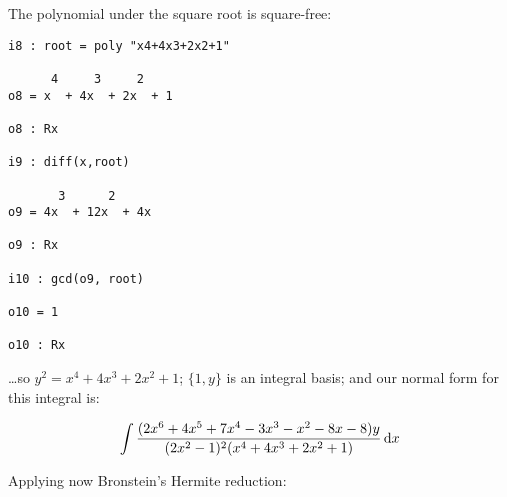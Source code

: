 The polynomial under the square root is square-free:

{\small\begin{verbatim}
i8 : root = poly "x4+4x3+2x2+1"

      4     3     2
o8 = x  + 4x  + 2x  + 1

o8 : Rx

i9 : diff(x,root)

       3      2
o9 = 4x  + 12x  + 4x

o9 : Rx

i10 : gcd(o9, root)

o10 = 1

o10 : Rx
\end{verbatim}}

\ldots so $y^2 = x^4+4 x^3+2 x^2+1$; $\{1, y\}$ is an integral basis;
and our normal form for this integral is:

$$\int {{(2x^6+4x^5+7x^4-3x^3-x^2-8x-8)y}\over{(2x^2-1)^2(x^4+4 x^3+2 x^2+1)}} \,{\rm d}x$$

Applying now Bronstein's Hermite reduction:


